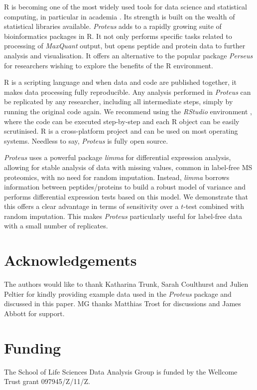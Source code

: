 \documentclass[]{article}
\begin{document}
R is becoming one of the most widely used tools for data science and
statistical computing, in particular in academia
\citep{tippmann2014, muenchen2017}. Its strength is built on the wealth
of statistical libraries available. \emph{Proteus} adds to a rapidly
growing suite of bioinformatics packages in R. It not only performs
specific tasks related to processing of \emph{MaxQuant} output, but
opens peptide and protein data to further analysis and visualisation. It
offers an alternative to the popular package \emph{Perseus} for
researchers wishing to explore the benefits of the R environment.

R is a scripting language and when data and code are published together,
it makes data processing fully reproducible. Any analysis performed in
\emph{Proteus} can be replicated by any researcher, including all
intermediate steps, simply by running the original code again. We
recommend using the \emph{RStudio} environment \citep{rstudio}, where
the code can be executed step-by-step and each R object can be easily
scrutinised. R is a cross-platform project and can be used on most
operating systems. Needless to say, \emph{Proteus} is fully open source.

\emph{Proteus} uses a powerful package \emph{limma} for differential
expression analysis, allowing for stable analysis of data with missing
values, common in label-free MS proteomics, with no need for random
imputation. Instead, \emph{limma} borrows information between
peptides/proteins to build a robust model of variance and performs
differential expression tests based on this model. We demonstrate that
this offers a clear advantage in terms of sensitivity over a \(t\)-test
combined with random imputation. This makes \emph{Proteus} particularly
useful for label-free data with a small number of replicates.

\section{Acknowledgements}\label{acknowledgements}

The authors would like to thank Katharina Trunk, Sarah Coulthurst and
Julien Peltier for kindly providing example data used in the
\emph{Proteus} package and discussed in this paper. MG thanks Matthias
Trost for discussions and James Abbott for support.

\section{Funding}\label{funding}

The School of Life Sciences Data Analysis Group is funded by the
Wellcome Trust grant 097945/Z/11/Z.

\renewcommand\refname{References}

\end{document}
